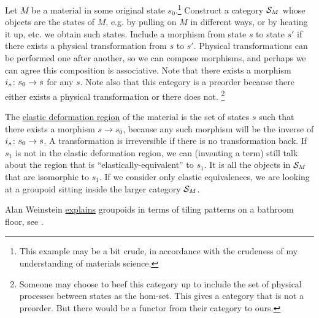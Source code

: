 \begin{application}

Let $M$ be a material in some original state $s_0$.\footnote{This example may be a bit crude, in accordance with the crudeness of my understanding of materials science.} Construct a category $\mathcal{S}_M$ whose objects are the states of $M$, e.g. by pulling on $M$ in different ways, or by heating it up, etc. we obtain such states. Include a morphism from state $s$ to state $s'$ if there exists a physical transformation from $s$ to $s'$. Physical transformations can be performed one after another, so we can compose morphisms, and perhaps we can agree this composition is associative. Note that there exists a morphism $i_s\colon s_0\rightarrow s$ for any $s$. Note also that this category is a preorder because there either exists a physical transformation or there does not. 
\footnote{Someone may choose to beef this category up to include the set of physical processes between states as the hom-set. This gives a category that is not a preorder. But there would be a functor from their category to ours.}

The \href{http://en.wikipedia.org/wiki/Elastic_modulus}{\text elastic deformation region} of the material is the set of states $s$ such that there exists a morphism $s\to s_0$, because any such morphism will be the inverse of $i_s\colon s_0\rightarrow s$. A transformation is irreversible if there is no transformation back. If $s_1$ is not in the elastic deformation region, we can (inventing a term) still talk about the region that is “elastically-equivalent” to $s_1$. It is all the objects in $\mathcal{S}_M$ that are isomorphic to $s_1$. If we consider only elastic equivalences, we are looking at a groupoid sitting inside the larger category $\mathcal{S}_M$.

\end{application}

\begin{example}

Alan Weinstein \href{http://www.ams.org/notices/199607/weinstein.pdf}{\text explains} groupoids in terms of tiling patterns on a bathroom floor, see \cite{WeA}.

\end{example}

